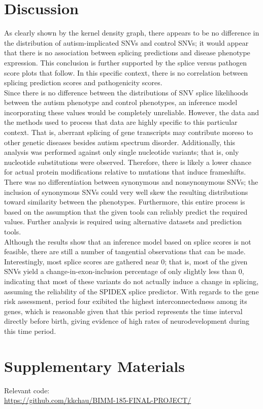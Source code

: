 \documentclass[12pt]{article}
\begin{document}
\section{Discussion}
As clearly shown by the kernel density graph, there appears to be no difference
in the distribution of autism-implicated SNVs and control SNVs; it would appear
that there is no association between splicing predictions and disease phenotype
expression. This conclusion is further supported by the splice versus 
pathogen score plots that follow. In this specific context, there is no 
correlation between splicing prediction scores and pathogenicity scores.
\\[\baselineskip]
Since there is no difference between the distributions of SNV splice 
likelihoods between the autism phenotype and control phenotypes, an inference
model incorporating these values would be completely unreliable. However,
the data and the methods used to process that data are highly specific to this 
particular context. That is, aberrant splicing of gene transcripts may 
contribute moreso to other genetic diseases besides autism spectrum disorder. 
Additionally, this analysis was performed against only single nucleotide 
variants; that is, only nucleotide substitutions were observed. Therefore,
there is likely a lower chance for actual protein modifications relative to
mutations that induce frameshifts. There was no differentiation between 
synonymous and nonsynonymous SNVs; the inclusion of synonymous SNVs could very
well skew the resulting distributions toward similarity between the phenotypes.
Furthermore, this entire process is based on the assumption that the given 
tools can reliably predict the required values. Further analysis is required
using alternative datasets and prediction tools.
\\[\baselineskip]
Although the results show that an inference model based on splice scores is not
feasible, there are still a number of tangential observations that can be made.
Interestingly, most splice scores are gathered near 0; that is, most of the 
given SNVs yield a change-in-exon-inclusion percentage of only slightly less
than 0, indicating that most of these variants do not actually induce a change in splicing,
assuming the reliability of the SPIDEX splice predictor. With regards to the 
gene risk assessment, period four exibited the highest interconnectedness 
among its genes, which is reasonable given that this period represents the 
time interval directly before birth, giving evidence of high rates of 
neurodevelopment during this time period.

\section{Supplementary Materials}
Relevant code:\\
\href{https://github.com/kkchau/BIMM-185-FINAL-PROJECT/}{https://github.com/kkchau/BIMM-185-FINAL-PROJECT/}
\end{document}
